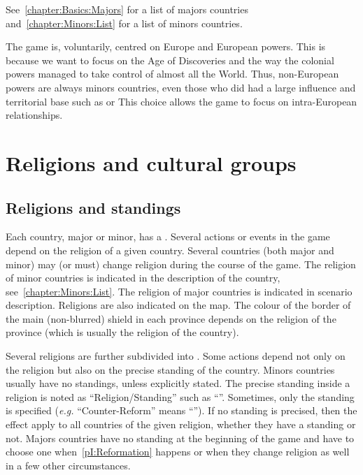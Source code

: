 \aparag See~\ref{chapter:Basics:Majors} for a list of majors countries
and~\ref{chapter:Minors:List} for a list of minors countries.

 The game is, voluntarily, centred on Europe and
European powers. This is because we want to focus on the Age of Discoveries
and the way the colonial powers managed to take control of almost all the
World.
\bparag Thus, non-European powers are always minors countries, even those who
did had a large influence and territorial base such as \paysChine or
\paysMogol %
\bparag This choice allows the game to focus on intra-European relationships.




\section{Religions and cultural groups}

\label{chThePowers:Religions}



\subsection{Religions and standings}

\aparag Each country, major or minor, has a .
\bparag Several actions or events in the game depend on the religion of a
given country.
\bparag Several countries (both major and minor) may (or must) change religion
during the course of the game.
\bparag The religion of minor countries is indicated in the description of the
country, see~\ref{chapter:Minors:List}. The religion of major countries is
indicated in scenario description.
\bparag Religions are also indicated on the map. The colour of the border of
the main (non-blurred) shield in each province depends on the religion of the
province (which is usually the religion of the country).

\aparag Several religions are further subdivided into . Some
actions depend not only on the religion but also on the precise standing of
the country.
\bparag Minors countries usually have no standings, unless explicitly stated.
\bparag The precise standing inside a religion is noted as
``Religion/Standing'' such as ``\CATHCR''. Sometimes, only the standing is
specified (\emph{e.g.} ``Counter-Reform'' means ``\CATHCR'').
\bparag If no standing is precised, then the effect apply to all countries of
the given religion, whether they have a standing or not.
\bparag Majors countries have no standing at the beginning of the game and
have to choose one when~\ref{pI:Reformation} happens or when they change
religion as well in a few other circumstances.



